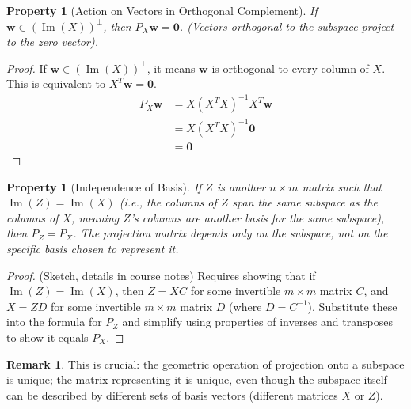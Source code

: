 \documentclass[11pt]{article}
\newtheorem{property}[theorem]{Property}
\theoremstyle{definition}
\newtheorem{remark}[theorem]{Remark}
\DeclareMathOperator{\Image}{Im} %
\newcommand{\vect}[1]{\mathbf{#1}} %
\begin{document}
\begin{property}[Action on Vectors in Orthogonal Complement]
If $\vect{w} \in (\Image(X))^{\perp}$, then $P_X \vect{w} = \vect{0}$. (Vectors orthogonal to the subspace project to the zero vector).
\end{property}
\begin{proof}
If $\vect{w} \in (\Image(X))^{\perp}$, it means $\vect{w}$ is orthogonal to every column of $X$. This is equivalent to $X^T \vect{w} = \vect{0}$.
\begin{align*}
P_X \vect{w} &= X(X^T X)^{-1} X^T \vect{w} \\
&= X(X^T X)^{-1} \vect{0} \\
&= \vect{0}
\end{align*}
\end{proof}

\begin{property}[Independence of Basis]
If $Z$ is another $n \times m$ matrix such that $\Image(Z) = \Image(X)$ (i.e., the columns of $Z$ span the same subspace as the columns of $X$, meaning $Z$'s columns are another basis for the same subspace), then $P_Z = P_X$. The projection matrix depends only on the subspace, not on the specific basis chosen to represent it.
\end{property}
\begin{proof}
(Sketch, details in course notes) Requires showing that if $\Image(Z)=\Image(X)$, then $Z = XC$ for some invertible $m \times m$ matrix $C$, and $X = ZD$ for some invertible $m \times m$ matrix $D$ (where $D=C^{-1}$). Substitute these into the formula for $P_Z$ and simplify using properties of inverses and transposes to show it equals $P_X$.
\end{proof}
\begin{remark}
This is crucial: the geometric operation of projection onto a subspace is unique; the matrix representing it is unique, even though the subspace itself can be described by different sets of basis vectors (different matrices $X$ or $Z$).
\end{remark}
\end{document}
